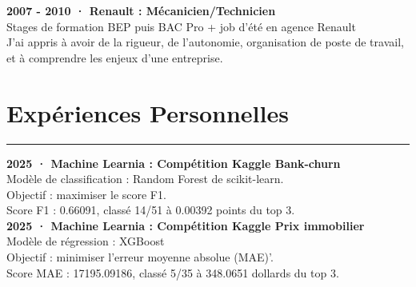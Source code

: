 \documentclass[a4paper,12pt]{article}
\newcommand{\sectionrule}[1]{%
\section*{#1}%
\vspace{-1em}%
\noindent\rule{\linewidth}{1pt}%
\vspace{0.5em}%
}
\begin{document}
\begin{paracol}{2}
\begin{rightcolumn}
\begin{minipage}[t][\dimexpr\textheight - 9em\relax][t]{\dimexpr\linewidth - 1.5em\relax}
{  \textbf{2007 - 2010 · Renault : Mécanicien/Technicien} \\
  Stages de formation BEP puis BAC Pro + job d'été en agence Renault\\
  J'ai appris à avoir de la rigueur, de l'autonomie, organisation de poste de travail,
  et à comprendre les enjeux d'une entreprise.

  \sectionrule{Expériences Personnelles}
 \textbf{2025 · Machine Learnia : Compétition Kaggle Bank-churn} \\
  Modèle de classification : Random Forest de scikit-learn.\\
  Objectif : maximiser le score F1.\\
  Score F1 : 0.66091, classé 14/51 à 0.00392 points du top 3.
  \vspace{0.5em}\\
  \textbf{2025 · Machine Learnia : Compétition Kaggle Prix immobilier} \\
  Modèle de régression : XGBoost\\
  Objectif : minimiser l'erreur moyenne absolue (MAE)'.\\
  Score MAE : 17195.09186, classé 5/35 à 348.0651 dollards du top 3.

  } %
\end{minipage}
\end{rightcolumn}

\end{paracol}
\end{document}
